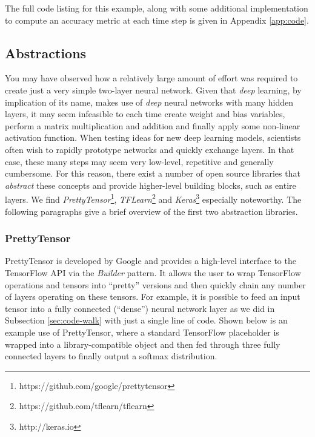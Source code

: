 The full code listing for this example, along with some additional
implementation to compute an accuracy metric at each time step is given in
Appendix \ref{app:code}.

\subsection{Abstractions}\label{sec:code-abstract}

You may have observed how a relatively large amount of effort was required to
create just a very simple two-layer neural network. Given that \emph{deep}
learning, by implication of its name, makes use of \emph{deep} neural networks
with many hidden layers, it may seem infeasible to each time create weight and
bias variables, perform a matrix multiplication and addition and finally apply
some non-linear activation function. When testing ideas for new deep learning
models, scientists often wish to rapidly prototype networks and quickly exchange
layers. In that case, these many steps may seem very low-level, repetitive and
generally cumbersome. For this reason, there exist a number of open source
libraries that \emph{abstract} these concepts and provide higher-level building
blocks, such as entire layers. We find
\emph{PrettyTensor}\footnote{https://github.com/google/prettytensor},
\emph{TFLearn}\footnote{https://github.com/tflearn/tflearn} and
\emph{Keras}\footnote{http://keras.io} especially noteworthy. The following
paragraphs give a brief overview of the first two abstraction libraries.

\subsubsection{PrettyTensor}\label{sec:code-abstract-prettytensor}

PrettyTensor is developed by Google and provides a high-level interface to the
TensorFlow API via the \emph{Builder} pattern. It allows the user to wrap
TensorFlow operations and tensors into ``pretty'' versions and then quickly
chain any number of layers operating on these tensors. For example, it is
possible to feed an input tensor into a fully connected (``dense'')
neural network layer as we did in Subsection \ref{sec:code-walk} with just a
single line of code. Shown below is an example use of PrettyTensor, where a
standard TensorFlow placeholder is wrapped into a library-compatible object and
then fed through three fully connected layers to finally output a softmax
distribution.

